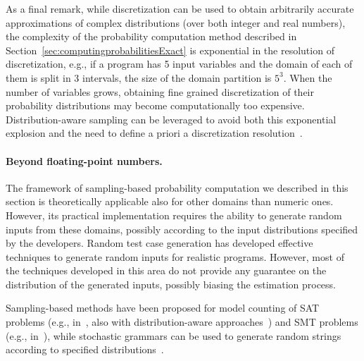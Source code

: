 As a final remark, while discretization can be used to obtain arbitrarily accurate approximations of complex distributions (over both integer and real numbers), the complexity of the probability computation method described in Section~\ref{sec:computingprobabilitiesExact} is exponential in the resolution of discretization, e.g., if a program has 5 input variables and the domain of each of them is split in 3 intervals, the size of the domain partition is $5^3$. When the number of variables grows, obtaining fine grained discretization of their probability distributions may become computationally too expensive. Distribution-aware sampling can be leveraged to avoid both this exponential explosion and the need to define a priori a discretization resolution~\cite{2015-fse-qcoral}.


\paragraph{Beyond floating-point numbers.}
The framework of sampling-based probability computation we described in this section is theoretically applicable also for other domains than numeric ones. However, its practical implementation requires the ability to generate random inputs from these domains, possibly according to the input distributions specified by the developers. Random test case generation has developed effective techniques to generate random inputs for realistic programs. However, most of the techniques developed in this area do not provide any guarantee on the distribution of the generated inputs, possibly biasing the estimation process. 

Sampling-based methods have been proposed for model counting of SAT problems (e.g., in~\cite{satCounting01,biere2009handbook,journalscorrMeel14}, also with distribution-aware approaches~\cite{chakraborty2014distribution}) and SMT problems (e.g., in~\cite{countingSMT}), while stochastic grammars can be used to generate random strings according to specified distributions~\cite{stochasticGrammars}.




